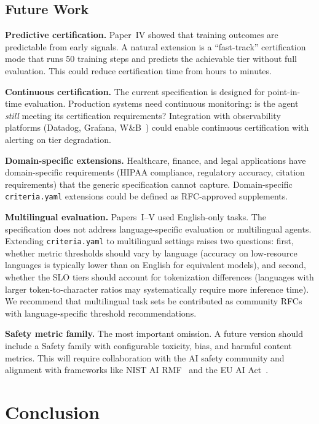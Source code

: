 \documentclass[11pt]{article}
\newcommand{\criteriayaml}{\texttt{criteria.yaml}}
\begin{document}
\subsection{Future Work}

\textbf{Predictive certification.} Paper~IV showed that training outcomes are predictable from early signals. A natural extension is a ``fast-track'' certification mode that runs 50 training steps and predicts the achievable tier without full evaluation. This could reduce certification time from hours to minutes.

\textbf{Continuous certification.} The current specification is designed for point-in-time evaluation. Production systems need continuous monitoring: is the agent \emph{still} meeting its certification requirements? Integration with observability platforms (Datadog, Grafana, W\&B~\citep{wandb2020}) could enable continuous certification with alerting on tier degradation.

\textbf{Domain-specific extensions.} Healthcare, finance, and legal applications have domain-specific requirements (HIPAA compliance, regulatory accuracy, citation requirements) that the generic specification cannot capture. Domain-specific \criteriayaml{} extensions could be defined as RFC-approved supplements.

\textbf{Multilingual evaluation.} Papers~I--V used English-only tasks. The specification does not address language-specific evaluation or multilingual agents. Extending \criteriayaml{} to multilingual settings raises two questions: first, whether metric thresholds should vary by language (accuracy on low-resource languages is typically lower than on English for equivalent models), and second, whether the SLO tiers should account for tokenization differences (languages with larger token-to-character ratios may systematically require more inference time). We recommend that multilingual task sets be contributed as community RFCs with language-specific threshold recommendations.

\textbf{Safety metric family.} The most important omission. A future version should include a Safety family with configurable toxicity, bias, and harmful content metrics. This will require collaboration with the AI safety community and alignment with frameworks like NIST AI RMF~\citep{nist2023airmf} and the EU AI Act~\citep{euaiact2024}.


\section{Conclusion}
\label{sec:conclusion}
\end{document}
